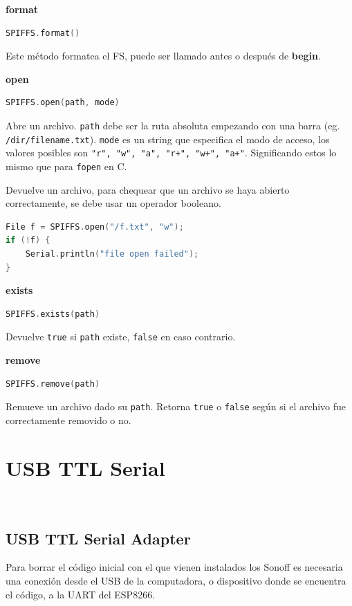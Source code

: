 \textbf{format}
\begin{lstlisting}[language=C]
SPIFFS.format()
\end{lstlisting}
Este método formatea el FS, puede ser llamado antes o después de \textbf{begin}.

\textbf{open}
\begin{lstlisting}[language=C]
SPIFFS.open(path, mode)
\end{lstlisting}
Abre un archivo. \lstinline[columns=fixed]{path} debe ser la ruta absoluta empezando con una barra (eg. \lstinline[columns=fixed]{/dir/filename.txt}). \lstinline[columns=fixed]{mode} es un string que especifica el modo de acceso, los valores posibles son \lstinline[columns=fixed]{"r", "w", "a", "r+", "w+", "a+"}. Significando estos lo mismo que para \lstinline[columns=fixed]{fopen} en C.

Devuelve un archivo, para chequear que un archivo se haya abierto correctamente, se debe usar un operador booleano.
\begin{lstlisting}[language=C]
File f = SPIFFS.open("/f.txt", "w");
if (!f) {
    Serial.println("file open failed");
}
\end{lstlisting}

\textbf{exists}
\begin{lstlisting}[language=C]
SPIFFS.exists(path)
\end{lstlisting}
Devuelve \lstinline[columns=fixed]{true} si \lstinline[columns=fixed]{path} existe, \lstinline[columns=fixed]{false} en caso contrario.

\textbf{remove}
\begin{lstlisting}[language=C]
SPIFFS.remove(path)
\end{lstlisting}
Remueve un archivo dado su \lstinline[columns=fixed]{path}. Retorna \lstinline[columns=fixed]{true} o \lstinline[columns=fixed]{false} según si el archivo fue correctamente removido o no.


\section{USB TTL Serial} ~

\subsection{USB TTL Serial Adapter}
Para borrar el código inicial con el que vienen instalados los Sonoff es necesaria una conexión desde el USB de la computadora, o dispositivo donde se encuentra el código, a la UART del ESP8266.

